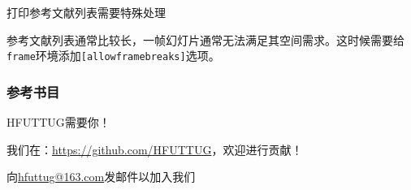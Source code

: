 \documentclass[aspectratio=169]{beamer}
\begin{document}
\begin{frame}{打印参考文献列表需要特殊处理}
	
	参考文献列表通常比较长，一帧幻灯片通常无法满足其空间需求。这时候需要给\texttt{frame}环境添加\texttt{[allowframebreaks]}选项。
\end{frame}

\begin{frame}[allowframebreaks]
\frametitle{参考书目}
{
	\tiny
	\nocite{*}
	\printbibliography[heading=none]
}
\end{frame}

\begin{frame}{HFUTTUG需要你！}
	\centering

	我们在：\url{https://github.com/HFUTTUG}，欢迎进行贡献！

	向\href{mailto:hfuttug@163.com}{hfuttug@163.com}发邮件以加入我们
\end{frame}
\end{document}

